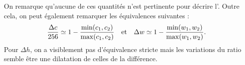 \documentclass[main.tex]{subfiles}
\begin{document}
On remarque qu'aucune de ces quantités n'est pertinente pour décrire l'\hetero. Outre cela, on peut également remarquer les équivalences suivantes :
\begin{equation}
\label{eq:equiv_diff_rapport}
\dfrac{\Delta c}{256} \simeq 1 - \dfrac{\min(c_1,c_2)}{\max(c_1,c_2)} \quad {\rm et } \quad \Delta w \simeq 1 - \dfrac{\min(w_1,w_2)}{\max(w_1,w_2)}.
\end{equation}
Pour $\Delta h$, on a visiblement pas d'équivalence stricte mais les variations du ratio semble être une dilatation de celles de la différence.
\end{document}
